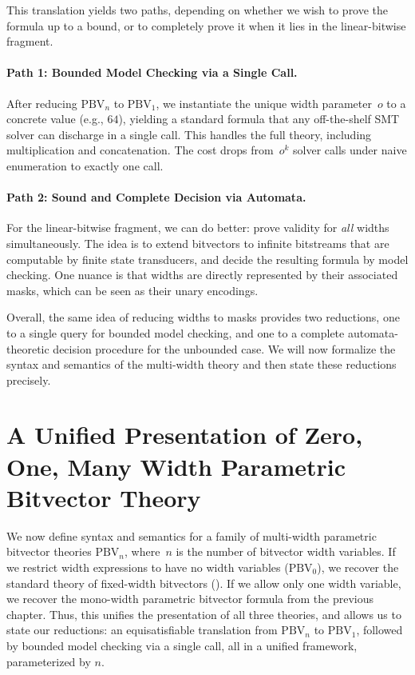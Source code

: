 This translation yields two paths, depending on whether we wish to prove the
formula up to a bound, or to completely prove it when it lies in the
linear-bitwise fragment.

\paragraph{Path 1: Bounded Model Checking via a Single \qfbv{} Call.}
%
After reducing $\text{PBV}_n$ to $\text{PBV}_1$, we instantiate the unique
width parameter~$o$ to a concrete value (e.g., $64$), yielding a standard
\qfbv{} formula that any off-the-shelf SMT solver can discharge in a single
call.  This handles the full theory, including multiplication and
concatenation.  The cost drops from~$o^k$ solver calls under naive enumeration
to exactly one call.

\paragraph{Path 2: Sound and Complete Decision via Automata.}
%
For the linear-bitwise fragment, we can do better: prove validity for \emph{all}
widths simultaneously.  The idea is to extend bitvectors to infinite bitstreams
that are computable by finite state transducers, and decide the resulting
formula by model checking. One nuance is that widths are directly represented by
their associated masks, which can be seen as their unary encodings.

\medskip
Overall, the same idea of reducing widths to masks provides two
reductions, one to a single \qfbv{} query for bounded model checking, and one to
a complete automata-theoretic decision procedure for the unbounded case. We will
now formalize the syntax and semantics of the multi-width theory and then state
these reductions precisely.


\section{A Unified Presentation of Zero, One, Many Width Parametric Bitvector Theory}
\label{sec:mwbv:theory}

We now define syntax and semantics for a family of multi-width
parametric bitvector theories $\text{PBV}_n$, where~$n$ is the number of
bitvector width variables.
%
If we restrict width expressions to have no width variables ($\text{PBV}_0$), we
recover the standard theory of fixed-width bitvectors (\qfbv{}). If we allow
only one width variable, we recover the mono-width parametric bitvector formula from the previous chapter.
%
Thus, this unifies the presentation of all three theories, and allows us to
state our reductions: an equisatisfiable translation from $\text{PBV}_n$ to
$\text{PBV}_1$, followed by bounded model checking via a single \qfbv{}
call, all in a unified framework, parameterized by $n$.

